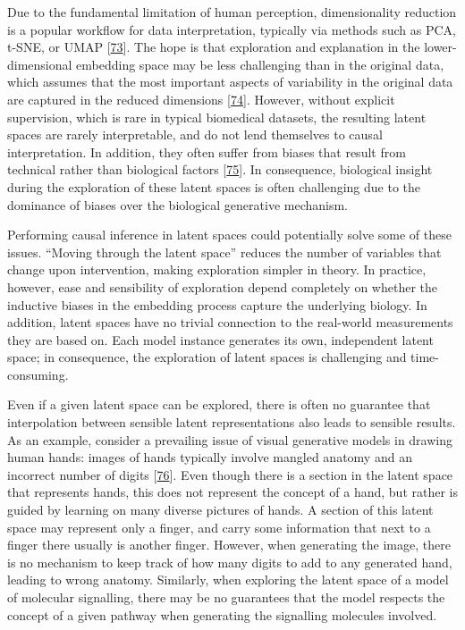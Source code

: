 Due to the fundamental limitation of human perception, dimensionality reduction is a popular workflow for data interpretation, typically via methods such as PCA, t-SNE, or UMAP {[}\protect\hyperlink{ref-13qoNo4Fj}{73}{]}.
The hope is that exploration and explanation in the lower-dimensional embedding space may be less challenging than in the original data, which assumes that the most important aspects of variability in the original data are captured in the reduced dimensions {[}\protect\hyperlink{ref-AO84A4MA}{74}{]}.
However, without explicit supervision, which is rare in typical biomedical datasets, the resulting latent spaces are rarely interpretable, and do not lend themselves to causal interpretation.
In addition, they often suffer from biases that result from technical rather than biological factors {[}\protect\hyperlink{ref-6McXkHVo}{75}{]}.
In consequence, biological insight during the exploration of these latent spaces is often challenging due to the dominance of biases over the biological generative mechanism.

Performing causal inference in latent spaces could potentially solve some of these issues.
``Moving through the latent space'' reduces the number of variables that change upon intervention, making exploration simpler in theory.
In practice, however, ease and sensibility of exploration depend completely on whether the inductive biases in the embedding process capture the underlying biology.
In addition, latent spaces have no trivial connection to the real-world measurements they are based on.
Each model instance generates its own, independent latent space; in consequence, the exploration of latent spaces is challenging and time-consuming.

Even if a given latent space can be explored, there is often no guarantee that interpolation between sensible latent representations also leads to sensible results.
As an example, consider a prevailing issue of visual generative models in drawing human hands: images of hands typically involve mangled anatomy and an incorrect number of digits {[}\protect\hyperlink{ref-iE5sGWcB}{76}{]}.
Even though there is a section in the latent space that represents hands, this does not represent the concept of a hand, but rather is guided by learning on many diverse pictures of hands.
A section of this latent space may represent only a finger, and carry some information that next to a finger there usually is another finger.
However, when generating the image, there is no mechanism to keep track of how many digits to add to any generated hand, leading to wrong anatomy.
Similarly, when exploring the latent space of a model of molecular signalling, there may be no guarantees that the model respects the concept of a given pathway when generating the signalling molecules involved.

